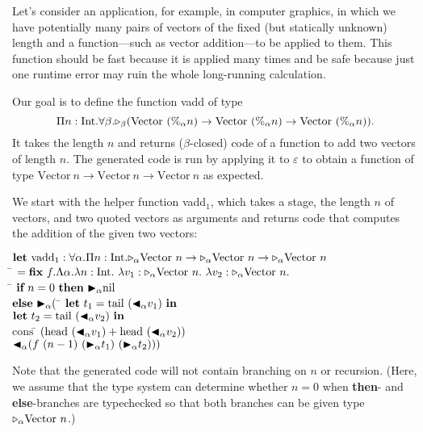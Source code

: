 Let's consider an application, for example, in computer graphics, in which we
have potentially many pairs of vectors of the fixed (but statically unknown)
length and a function---such as vector addition---to be applied to
them. This function should be fast because it is applied many times and be
safe because just one runtime error may ruin the whole long-running calculation.

\newcommand{\Vpn}{\text{Vector}\ (\%_\alpha n)}

Our goal is to define the function vadd of type
\[
  \Pi n:\I.\F\beta.\TW_\beta(\Vpn\to\Vpn\to\Vpn).
\]
\renewcommand{\Vpn}{\text{Vector}\ n}
It takes the length $n$ and returns ($\beta$-closed) code of a
function to add two vectors of length $n$.  The generated
code is run by applying it to \(\varepsilon\) to obtain
a function of type \(\Vpn\to\Vpn\to\Vpn\) as expected.

We start with the helper function vadd$_1$, which takes a stage, the length $n$ of vectors, and two quoted vectors as arguments and returns code that computes the addition of the given two vectors:
%
\begin{tabbing}
	  $\textbf{let}\ \text{vadd}_1 : \F\alpha.\Pi n:\I.\TW_\alpha\Vpn\to\TW_\alpha\Vpn\to\TW_\alpha\Vpn$                                \\
	  \hspace{6mm} \= $= \textbf{fix}\ f.\Lambda\alpha.\lambda n:\I.\ \lambda v_1:\TW_\alpha\Vpn.\ \lambda v_2:\TW_\alpha\Vpn.$            \\
	  \> \hspace{6mm} \= $\textbf{if}\ n = 0 \ \textbf{then}\ {\mathop{\blacktriangleright}}_\alpha \text{nil}$ \\
	  \>\> $\textbf{else}\ {\mathop{\blacktriangleright}}_\alpha ($ \= $\textbf{let}\ t_1 = \text{tail}\ ({\mathop{\blacktriangleleft}}_\alpha v_1)\ \textbf{in}$ \\
	  \>\>\> $\textbf{let}\ t_2 = \text{tail}\ ({\mathop{\blacktriangleleft}}_\alpha v_2)\ \textbf{in}$ \\
          \>\>\> $\text{cons}\ $\= $(\text{head}\ ({\mathop{\blacktriangleleft}}_\alpha v_1) + \text{head} \ ({\mathop{\blacktriangleleft}}_\alpha v_2))$ \\
          \>\>\>\> ${\mathop{\blacktriangleleft}}_\alpha (f\ (n-1)\ ({\mathop{\blacktriangleright}}_\alpha t_1)\ ({\mathop{\blacktriangleright}}_\alpha t_2)))$
\end{tabbing}
Note that the generated code will not contain branching on $n$ or recursion.
(Here, we assume that the type system can determine whether $n=0$ when
\textbf{then}- and \textbf{else}-branches are typechecked so that
both branches can be given type \({\mathop{\triangleright}}_\alpha \text{Vector }n\).)

